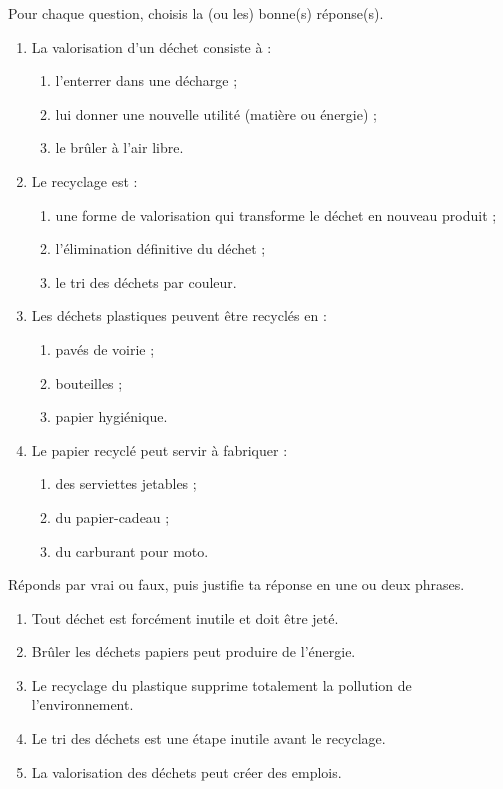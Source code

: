 \documentclass[11pt]{article}
\begin{document}
\begin{exercice}
Pour chaque question, choisis la (ou les) bonne(s) réponse(s).
\begin{enumerate}
\item La valorisation d'un déchet consiste à :
\begin{enumerate}
\item l'enterrer dans une décharge ;
\item lui donner une nouvelle utilité (matière ou énergie) ;
\item le brûler à l'air libre.
\end{enumerate}
\item Le recyclage est :
\begin{enumerate}
\item une forme de valorisation qui transforme le déchet en nouveau produit ;
\item l'élimination définitive du déchet ;
\item le tri des déchets par couleur.
\end{enumerate}
\item Les déchets plastiques peuvent être recyclés en :
\begin{enumerate}
\item pavés de voirie ; \item bouteilles ; \item papier hygiénique.
\end{enumerate}
\item Le papier recyclé peut servir à fabriquer :
\begin{enumerate}
\item des serviettes jetables ; \item du papier-cadeau ; \item du carburant pour moto.
\end{enumerate}
\end{enumerate}
\end{exercice}

\begin{exercice}
Réponds par vrai ou faux, puis justifie ta réponse en une ou deux phrases.
\begin{enumerate}
\item Tout déchet est forcément inutile et doit être jeté.
\item Brûler les déchets papiers peut produire de l'énergie.
\item Le recyclage du plastique supprime totalement la pollution de l'environnement.
\item Le tri des déchets est une étape inutile avant le recyclage.
\item La valorisation des déchets peut créer des emplois.
\end{enumerate}
\end{exercice}
\end{document}
